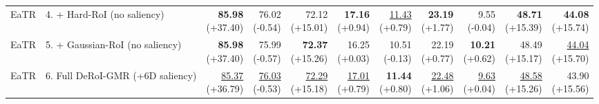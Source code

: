 \documentclass{article}
\begin{document}
{\begin{tabular}{llrrrrrrrrr}
EaTR & 4. + Hard-RoI (no saliency) & \shortstack{\textbf{85.98} \\ {\scriptsize (+37.40)}} & \shortstack{76.02 \\ {\scriptsize (-0.54)}} & \shortstack{72.12 \\ {\scriptsize (+15.01)}} & \shortstack{\textbf{17.16} \\ {\scriptsize (+0.94)}} & \shortstack{\underline{11.43} \\ {\scriptsize (+0.79)}} & \shortstack{\textbf{23.19} \\ {\scriptsize (+1.77)}} & \shortstack{9.55 \\ {\scriptsize (-0.04)}} & \shortstack{\textbf{48.71} \\ {\scriptsize (+15.39)}} & \shortstack{\textbf{44.08} \\ {\scriptsize (+15.74)}} \\
EaTR & 5. + Gaussian-RoI (no saliency) & \shortstack{\textbf{85.98} \\ {\scriptsize (+37.40)}} & \shortstack{75.99 \\ {\scriptsize (-0.57)}} & \shortstack{\textbf{72.37} \\ {\scriptsize (+15.26)}} & \shortstack{16.25 \\ {\scriptsize (+0.03)}} & \shortstack{10.51 \\ {\scriptsize (-0.13)}} & \shortstack{22.19 \\ {\scriptsize (+0.77)}} & \shortstack{\textbf{10.21} \\ {\scriptsize (+0.62)}} & \shortstack{48.49 \\ {\scriptsize (+15.17)}} & \shortstack{\underline{44.04} \\ {\scriptsize (+15.70)}} \\
EaTR & 6. Full DeRoI-GMR (+6D saliency) & \shortstack{\underline{85.37} \\ {\scriptsize (+36.79)}} & \shortstack{\underline{76.03} \\ {\scriptsize (-0.53)}} & \shortstack{\underline{72.29} \\ {\scriptsize (+15.18)}} & \shortstack{\underline{17.01} \\ {\scriptsize (+0.79)}} & \shortstack{\textbf{11.44} \\ {\scriptsize (+0.80)}} & \shortstack{\underline{22.48} \\ {\scriptsize (+1.06)}} & \shortstack{\underline{9.63} \\ {\scriptsize (+0.04)}} & \shortstack{\underline{48.58} \\ {\scriptsize (+15.26)}} & \shortstack{43.90 \\ {\scriptsize (+15.56)}} \\

\end{tabular}}
\end{document}
